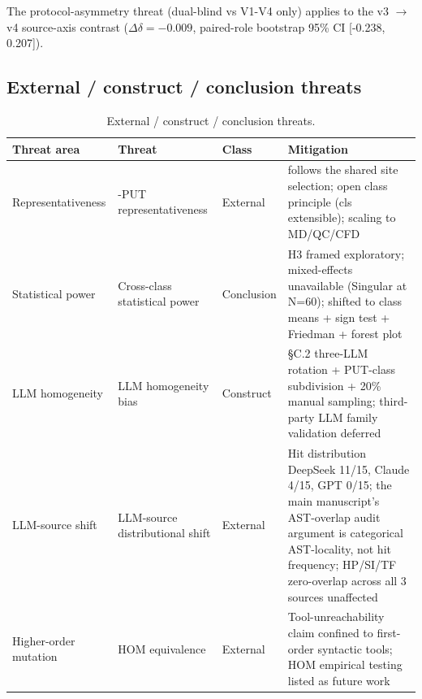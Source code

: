 \documentclass[review,12pt,authoryear]{elsarticle}
\begin{document}
The protocol-asymmetry threat (dual-blind vs V1-V4 only) applies to the
v3 $\to$ v4 source-axis contrast ($\Delta\delta = -0.009$, paired-role
bootstrap 95\% CI [-0.238, 0.207]).

\subsection{External / construct / conclusion threats}\label{f.2-external-construct-conclusion-threats}

{\def\LTcaptype{table} %
\begin{longtable}[]{@{}
  >{\raggedright\arraybackslash}p{}
  >{\raggedright\arraybackslash}p{}
  >{\raggedright\arraybackslash}p{}
  >{\raggedright\arraybackslash}p{}@{}}
\caption{External / construct / conclusion threats.}\label{tab:p2-28}\\
\toprule\noalign{}
\begin{minipage}[b]{\linewidth}\raggedright
Threat area
\end{minipage} & \begin{minipage}[b]{\linewidth}\raggedright
Threat
\end{minipage} & \begin{minipage}[b]{\linewidth}\raggedright
Class
\end{minipage} & \begin{minipage}[b]{\linewidth}\raggedright
Mitigation
\end{minipage} \\
\midrule\noalign{}
\endfirsthead
\endhead
\bottomrule\noalign{}
\endlastfoot
Representativeness & 12-PUT representativeness & External & follows the shared site selection;
open class principle (cls extensible); scaling to MD/QC/CFD \\
Statistical power & Cross-class statistical power & Conclusion & H3 framed exploratory;
mixed-effects unavailable (Singular at N=60); shifted to class means +
sign test + Friedman + forest plot \\
LLM homogeneity & LLM homogeneity bias & Construct & §C.2 three-LLM rotation +
PUT-class subdivision + 20\% manual sampling; third-party LLM family
validation deferred \\
LLM-source shift & LLM-source distributional shift & External & Hit distribution
DeepSeek 11/15, Claude 4/15, GPT 0/15; the main manuscript's AST-overlap audit argument is categorical
AST-locality, not hit frequency; HP/SI/TF zero-overlap across all 3
sources unaffected \\
Higher-order mutation & HOM equivalence & External & Tool-unreachability claim confined to
first-order syntactic tools; HOM empirical testing listed as future
work \\
\end{longtable}
}
\end{document}
